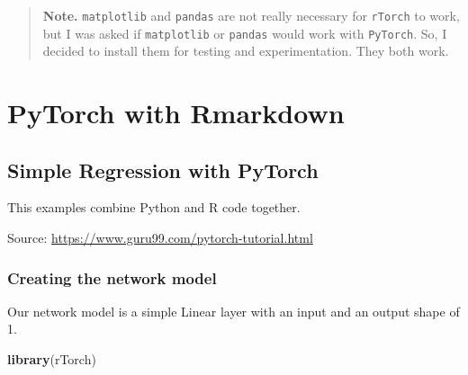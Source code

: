 \documentclass[]{book}
\newenvironment{Shaded}{\begin{snugshade}}{\end{snugshade}}
\newcommand{\KeywordTok}[1]{\textcolor[rgb]{0.13,0.29,0.53}{\textbf{#1}}}
\newcommand{\NormalTok}[1]{#1}
\begin{document}
\begin{quote}
\textbf{Note.} \texttt{matplotlib} and \texttt{pandas} are not really necessary for \texttt{rTorch} to work, but I was asked if \texttt{matplotlib} or \texttt{pandas} would work with \texttt{PyTorch}. So, I decided to install them for testing and experimentation. They both work.
\end{quote}

\hypertarget{part-pytorch-with-rmarkdown}{%
\part{PyTorch with Rmarkdown}\label{part-pytorch-with-rmarkdown}}

\hypertarget{simple-regression-with-pytorch}{%
\chapter{Simple Regression with PyTorch}\label{simple-regression-with-pytorch}}

This examples combine Python and R code together.

Source: \url{https://www.guru99.com/pytorch-tutorial.html}

\hypertarget{creating-the-network-model}{%
\section{Creating the network model}\label{creating-the-network-model}}

Our network model is a simple Linear layer with an input and an output shape of 1.

\begin{Shaded}
\begin{Highlighting}[]
\KeywordTok{library}\NormalTok{(rTorch)}
\end{Highlighting}
\end{Shaded}
\end{document}
